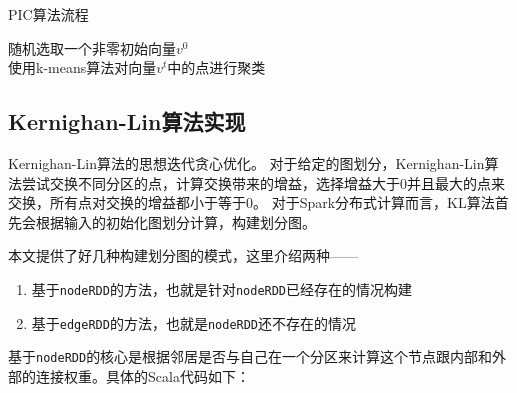 \begin{algorithm}[htbp]
\caption{PIC算法流程}
\SetAlgoLined
{}
随机选取一个非零初始向量$v^0$ \\
使用k-means算法对向量$v^t$中的点进行聚类
\end{algorithm}

\subsection{Kernighan-Lin算法实现}

Kernighan-Lin算法的思想迭代贪心优化。
对于给定的图划分，Kernighan-Lin算法尝试交换不同分区的点，计算交换带来的增益，选择增益大于$0$并且最大的点来交换，所有点对交换的增益都小于等于$0$。
对于Spark分布式计算而言，KL算法首先会根据输入的初始化图划分计算，构建划分图。

本文提供了好几种构建划分图的模式，这里介绍两种——
\begin{enumerate}
    \item 基于\texttt{nodeRDD}的方法，也就是针对\texttt{nodeRDD}已经存在的情况构建
    \item 基于\texttt{edgeRDD}的方法，也就是\texttt{nodeRDD}还不存在的情况
\end{enumerate}

基于\texttt{nodeRDD}的核心是根据邻居是否与自己在一个分区来计算这个节点跟内部和外部的连接权重。具体的Scala代码如下：

